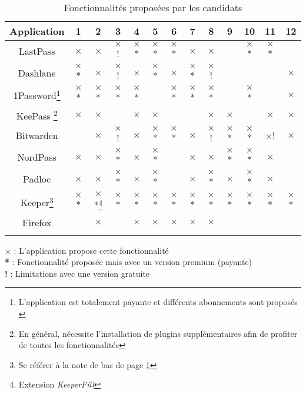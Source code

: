 \begin{longtable}[h]{|c|c|c|c|c|c|c|c|c|c|c|c|c|}
	\hline
	Application & 1 & 2 & 3 & 4 & 5 & 6 & 7 & 8 & 9 & 10 & 11 & 12 \\
	\hline
	LastPass & $\times$ & $\times$ & $\times$! & $\times$* & $\times$* &  $\times$*& $\times$ & $\times$ & & $\times$* & $\times$* &  \\
		\hline
	Dashlane & $\times$* & $\times$ & $\times$! & $\times$ & $\times$* & $\times$ & $\times$* & $\times$! & & &  & $\times$ \\
		\hline
	1Password\footnote{L'application est totalement payante et différents abonnements sont proposés \label{1p}} & $\times$* & $\times$* & $\times$* & $\times$* & & $\times$* & $\times$* & $\times$* & & $\times$* & & $\times$ \\
			\hline
	KeePass \footnote{En général, nécessite l'installation de plugins supplémentaires afin de profiter de toutes les fonctionnalités} & $\times$ & $\times$ &  & $\times$ & $\times$ & & & $\times$ & $\times$ & & $\times$ & $\times$ \\
		\hline
	Bitwarden &  & $\times$  & $\times$! & $\times$ & $\times$* & $\times$* & $\times$ & $\times$! & $\times$* &  $\times$* & $\times$! & $\times$\\
	\hline
	NordPass & $\times$ & $\times$ & $\times$*  & $\times$ & $\times$* & & $\times$ & $\times$ & $\times$* & $\times$* & $\times$ & \\
	\hline
	Padloc & $\times$ & $\times$ & $\times$* & $\times$ & $\times$* & & $\times$ & $\times$* & $\times$ & $\times$* & $\times$ & \\
	\hline
	Keeper\footnote{Se référer à la note de bas de page \ref{1p}} & $\times$* & $\times$*\footnote{Extension \textit{KeeperFill}} & $\times$* & $\times$* &$\times$* & $\times$* & $\times$* &$\times$* &$\times$* & $\times$* & $\times$* & $\times$* \\
	\hline
	Firefox &  & $\times$  &  & $\times$  & $\times$ & $\times$ & $\times$ & $\times$  &  &  &  & \\
	\hline
	\caption{Fonctionnalités proposées par les candidats}
\end{longtable} 
$\times$ : L'application propose cette fonctionnalité \\
\textbf{*}\hspace{0.1cm} : Fonctionnalité proposée mais avec un version premium (payante) \\
\textbf{!}\hspace{0.18cm} : Limitations avec une version gratuite \\

